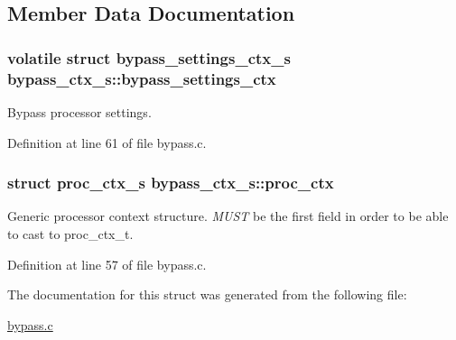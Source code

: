 \subsection{Member Data Documentation}
\subsubsection[{\texorpdfstring{bypass\+\_\+settings\+\_\+ctx}{bypass_settings_ctx}}]{\setlength{\rightskip}{0pt plus 5cm}volatile struct {\bf bypass\+\_\+settings\+\_\+ctx\+\_\+s} bypass\+\_\+ctx\+\_\+s\+::bypass\+\_\+settings\+\_\+ctx}\hypertarget{structbypass__ctx__s_a490fe71a913f9bae1bab3208746d9ab4}{}\label{structbypass__ctx__s_a490fe71a913f9bae1bab3208746d9ab4}
Bypass processor settings. 

Definition at line 61 of file bypass.\+c.

\subsubsection[{\texorpdfstring{proc\+\_\+ctx}{proc_ctx}}]{\setlength{\rightskip}{0pt plus 5cm}struct {\bf proc\+\_\+ctx\+\_\+s} bypass\+\_\+ctx\+\_\+s\+::proc\+\_\+ctx}\hypertarget{structbypass__ctx__s_abc729b752c9d47955160e520a05177fd}{}\label{structbypass__ctx__s_abc729b752c9d47955160e520a05177fd}
Generic processor context structure. {\itshape M\+U\+ST} be the first field in order to be able to cast to proc\+\_\+ctx\+\_\+t. 

Definition at line 57 of file bypass.\+c.



The documentation for this struct was generated from the following file\+:\begin{DoxyCompactItemize}
\item 
\hyperlink{bypass_8c}{bypass.\+c}\end{DoxyCompactItemize}
